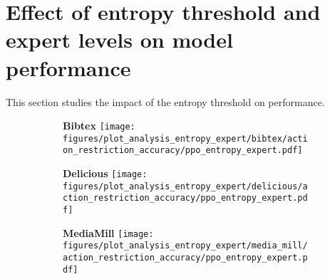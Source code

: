 
  
    
\section{Effect of entropy threshold and expert levels on model performance}
\label{sec:app_entr_threshold_expert_acc_perf}

This section studies the impact of the entropy threshold on performance.
\captionsetup{font=footnotesize}
\begin{figure}[H]
     \caption{Comparison of model performance for different values of entropy and expert accuracies for feedback: Action Recommendation. The size and color of each bubble in the bubble plots represent the magnitude of the mean cumulative reward.}
    \label{fig:app_entr_thresh_expert_acc_action_recommendation}
    \centering
    \begin{subfigure}[b]{0.32\columnwidth}
        \centering
        \setlength{\fboxsep}{1pt}\colorbox{lightgray!30}{\textbf{Bibtex}}
        \texttt{[image: figures/plot\_analysis\_entropy\_expert/bibtex/action\_restriction\_accuracy/ppo\_entropy\_expert.pdf]}
    \end{subfigure}
    \hfill
    \begin{subfigure}[b]{0.32\columnwidth}
        \centering
        \setlength{\fboxsep}{1pt}\colorbox{lightgray!30}{\textbf{Delicious}}
        \texttt{[image: figures/plot\_analysis\_entropy\_expert/delicious/action\_restriction\_accuracy/ppo\_entropy\_expert.pdf]}
    \end{subfigure}
    \hfill
    \begin{subfigure}[b]{0.32\columnwidth}
        \centering
        \setlength{\fboxsep}{1pt}\colorbox{lightgray!30}{\textbf{MediaMill}}
        \texttt{[image: figures/plot\_analysis\_entropy\_expert/media\_mill/action\_restriction\_accuracy/ppo\_entropy\_expert.pdf]}
    \end{subfigure}
    \hfill
    

\end{figure}
